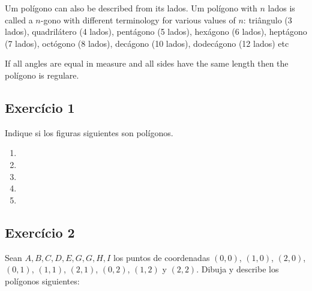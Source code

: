 Um polígono can also be described from its lados.
Um polígono with $n$ lados is called
a $n$-gono with different terminology for various values of $n$:
triângulo (3 lados), quadrilátero (4 lados), pentágono (5 lados),
hexágono (6 lados), heptágono (7 lados), octógono (8 lados),
decágono (10 lados), dodecágono (12 lados) etc

If all angles are equal in measure and all sides have the same length then
the polígono is regulare.

\subsection*{Exercício 1}

Indique si los figuras siguientes son polígonos.

\begin{enumerate}

\item

\item

\item

\item

\item


\end{enumerate}

\subsection*{Exercício 2}

Sean $A,B,C,D,E,G,G,H,I$ los puntos de coordenadas
$(0,0)$, $(1,0)$, $(2,0)$,
$(0,1)$, $(1,1)$, $(2,1)$,
$(0,2)$, $(1,2)$ y $(2,2)$. Dibuja y describe los polígonos siguientes:

